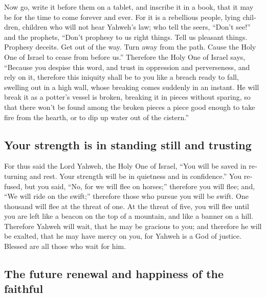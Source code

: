 \begin{paracol}{2}
\begin{otherlanguage}{english}
 Now go, write it before them on a tablet, and inscribe it
in a book, that it may be for the time to come forever and ever.
 For it is a rebellious people, lying children, children
who will not hear Yahweh's law;  who tell the seers,
``Don't see!'' and the prophets, ``Don't prophesy to us right things.
Tell us pleasant things. Prophesy deceits.  Get out of
the way. Turn away from the path. Cause the Holy One of Israel to cease
from before us.''  Therefore the Holy One of Israel says,
``Because you despise this word, and trust in oppression and
perverseness, and rely on it,  therefore this iniquity
shall be to you like a breach ready to fall, swelling out in a high
wall, whose breaking comes suddenly in an instant.  He
will break it as a potter's vessel is broken, breaking it in pieces
without sparing, so that there won't be found among the broken pieces a
piece good enough to take fire from the hearth, or to dip up water out
of the cistern.''

\hypertarget{your-strength-is-in-standing-still-and-trusting}{%
\subsection{Your strength is in standing still and
trusting}\label{your-strength-is-in-standing-still-and-trusting}}

 For thus said the Lord Yahweh, the Holy One of Israel,
``You will be saved in returning and rest. Your strength will be in
quietness and in confidence.'' You refused,  but you
said, ``No, for we will flee on horses;'' therefore you will flee; and,
``We will ride on the swift;'' therefore those who pursue you will be
swift.  One thousand will flee at the threat of one. At
the threat of five, you will flee until you are left like a beacon on
the top of a mountain, and like a banner on a hill. 
Therefore Yahweh will wait, that he may be gracious to you; and
therefore he will be exalted, that he may have mercy on you, for Yahweh
is a God of justice. Blessed are all those who wait for him.

\hypertarget{the-future-renewal-and-happiness-of-the-faithful}{%
\subsection{The future renewal and happiness of the
faithful}\label{the-future-renewal-and-happiness-of-the-faithful}}


\end{otherlanguage}
\end{paracol}
